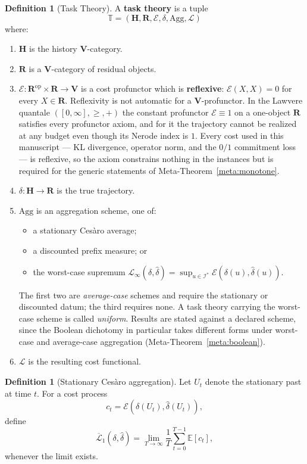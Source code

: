 \documentclass[12pt]{article}
\theoremstyle{definition}
\newtheorem{definition}[theorem]{Definition}
\begin{document}
\begin{definition}[Task Theory]
\label{def:task-theory}
A \textbf{task theory} is a tuple
\[
\mathbb T=(\mathbf H,\mathbf R,\mathcal E,\delta,\mathrm{Agg},\mathcal L)
\]
where:
\begin{enumerate}[nosep,label=(\arabic*)]
\item $\mathbf H$ is the history $\mathbf V$-category.
\item $\mathbf R$ is a $\mathbf V$-category of residual objects.
\item $\mathcal E:\mathbf R^{\mathrm{op}}\times\mathbf R\to\mathbf V$ is a
cost profunctor which is \textbf{reflexive}: $\mathcal E(X,X)=0$ for every
$X\in\mathbf R$.  Reflexivity is not automatic for a $\mathbf V$-profunctor.
In the Lawvere quantale $([0,\infty],\ge,+)$ the constant profunctor
$\mathcal E\equiv1$ on a one-object $\mathbf R$ satisfies every profunctor
axiom, and for it the trajectory cannot be realized at any budget even though
its Nerode index is $1$.  Every cost used in this manuscript --- KL divergence,
operator norm, and the $0/1$ commitment loss --- is reflexive, so the axiom
constrains nothing in the instances but is required for the generic statements
of Meta-Theorem~\ref{meta:monotone}.
\item $\delta:\mathbf H\to\mathbf R$ is the true trajectory.
\item $\mathrm{Agg}$ is an aggregation scheme, one of:
\begin{itemize}[nosep]
\item a stationary Ces\`aro average;
\item a discounted prefix measure; or
\item the worst-case supremum
$\mathcal L_\infty(\delta,\widehat\delta)=\sup_{u\in\mathcal I^*}
\mathcal E(\delta(u),\widehat\delta(u))$.
\end{itemize}
The first two are \emph{average-case} schemes and require the stationary or
discounted datum; the third requires none.  A task theory carrying the
worst-case scheme is called \emph{uniform}.  Results are stated against a
declared scheme, since the Boolean dichotomy in particular takes different
forms under worst-case and average-case aggregation
(Meta-Theorem~\ref{meta:boolean}).
\item $\mathcal L$ is the resulting cost functional.
\end{enumerate}
\end{definition}

\begin{definition}[Stationary Ces\`aro aggregation]
\label{def:cesaro-agg}
Let $U_t$ denote the stationary past at time $t$.  For a cost process
\[
c_t=\mathcal E(\delta(U_t),\widehat\delta(U_t)),
\]
define
\[
\overline{\mathcal L}_1(\delta,\widehat\delta)
=
\lim_{T\to\infty}
\frac1T
\sum_{t=0}^{T-1}
\mathbb E[c_t],
\]
whenever the limit exists.
\end{definition}
\end{document}
